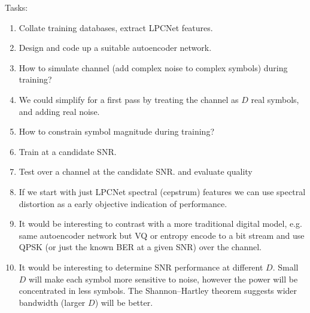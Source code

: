 \documentclass{article}
\begin{document}
Tasks:
\begin{enumerate}
\item Collate training databases, extract LPCNet features.
\item Design and code up a suitable autoencoder network.
\item How to simulate channel (add complex noise to complex symbols) during training?
\item We could simplify for a first pass by treating the channel as $D$ real symbols, and adding real noise.
\item How to constrain symbol magnitude during training?
\item Train at a candidate SNR.
\item Test over a channel at the candidate SNR. and evaluate quality
\item If we start with just LPCNet spectral (cepstrum) features we can use spectral distortion as a early objective indication of performance.
\item It would be interesting to contrast with a more traditional digital model, e.g. same autoencoder network but VQ or entropy encode to a bit stream and use QPSK (or just the known BER at a given SNR) over the channel.
\item It would be interesting to determine SNR performance at different $D$. Small $D$ will make each symbol more sensitive to noise, however the power will be concentrated in less symbols.  The Shannon–Hartley theorem suggests wider bandwidth (larger $D$) will be better.
\end{enumerate}
\end{document}
